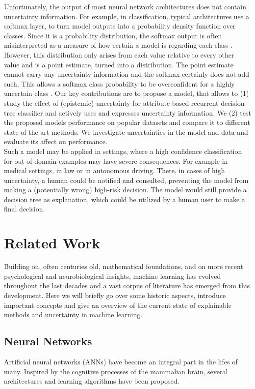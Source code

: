 \documentclass[a4paper,cleardoubleempty,BCOR1cm, 11pt]{report}
\begin{document}
Unfortunately, the output of most neural network architectures does not contain uncertainty information. For example, in classification, typical architectures use a softmax layer, to turn model outputs into a probability density function \cite{nwankpa2018activation} over classes. Since it is a probability distribution, the softmax output is often misinterpreted as a measure of how certain a model is regarding each class \cite{sensoy2018evidential}. However, this distribution only arises from each value relative to every other value and is a point estimate, turned into a distribution. The point estimate cannot carry any uncertainty information and the softmax certainly does not add such. This allows a softmax class probability to be overconfident for a highly uncertain class \cite{gal2016dropout}.
Our key contributions are to propose a model, that allows to (1) study the effect of (epistemic) uncertainty for attribute based recurrent decision tree classifier and actively uses and expresses uncertainty information. We (2) test the proposed models performance on popular datasets and compare it to different state-of-the-art methods. We investigate uncertainties in the model and data and evaluate its affect on performance. \\
Such a model may be applied in settings, where a high confidence classification for out-of-domain examples may have severe consequences. For example in medical settings, in law or in autonomous driving. There, in cases of high uncertainty, a human could be notified and consulted, preventing the model from making a (potentially wrong) high-risk decision. The model would still provide a decision tree as explanation, which could be utilized by a human user to make a final decision.




\chapter{Related Work}
Building on, often centuries old, mathematical foundations, and on more recent psychological and neurobiological insights, machine learning has evolved throughout the last decades and a vast corpus of literature has emerged from this development. Here we will briefly go over some historic aspects, introduce important concepts and give an overview of the current state of explainable methods and uncertainty in machine learning. 


\section{Neural Networks}
Artificial neural networks (ANNs) have become an integral part in the lifes of many. Inspired by the cognitive processes of the mammalian brain, several architectures and learning algorithms have been proposed.
\end{document}
